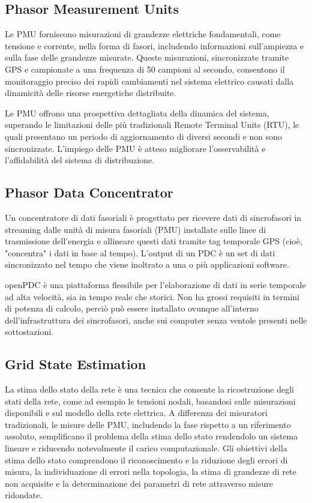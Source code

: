\subsection{Phasor Measurement Units}
Le PMU forniscono misurazioni di grandezze elettriche fondamentali, come tensione e corrente, nella forma di fasori, includendo informazioni sull'ampiezza e sulla fase delle grandezze misurate. Queste misurazioni, sincronizzate tramite GPS e campionate a una frequenza di 50 campioni al secondo, consentono il monitoraggio preciso dei rapidi cambiamenti nel sistema elettrico causati dalla dinamicità delle risorse energetiche distribuite.

Le PMU offrono una prospettiva dettagliata della dinamica del sistema, superando le limitazioni delle più tradizionali Remote Terminal Units (RTU), le quali presentano un periodo di aggiornamento di diversi secondi e non sono sincronizzate. L'impiego delle PMU è atteso migliorare l'osservabilità e l'affidabilità del sistema di distribuzione.

\subsection{Phasor Data Concentrator}
Un concentratore di dati fasoriali è progettato per ricevere dati di sincrofasori in streaming dalle unità di misura fasoriali (PMU) installate sulle linee di trasmissione dell'energia e allineare questi dati tramite tag temporale GPS (cioè, "concentra" i dati in base al tempo). L'output di un PDC è un set di dati sincronizzato nel tempo che viene inoltrato a una o più applicazioni software.

openPDC è una piattaforma flessibile per l'elaborazione di dati in serie temporale ad alta velocità, sia in tempo reale che storici. Non ha grossi requisiti in termini di potenza di calcolo, perciò può essere installato ovunque all'interno dell'infrastruttura dei sincrofasori, anche sui computer senza ventole presenti nelle sottostazioni.

\subsection{Grid State Estimation}
La stima dello stato della rete è una tecnica che consente la ricostruzione degli stati della rete, come ad esempio le tensioni nodali, basandosi sulle misurazioni disponibili e sul modello della rete elettrica. A differenza dei misuratori tradizionali, le misure delle PMU, includendo la fase rispetto a un riferimento assoluto, semplificano il problema della stima dello stato rendendolo un sistema lineare e riducendo notevolmente il carico computazionale. Gli obiettivi della stima dello stato comprendono il riconoscimento e la riduzione degli errori di misura, la individuazione di errori nella topologia, la stima di grandezze di rete non acquisite e la determinazione dei parametri di rete attraverso misure ridondate.

